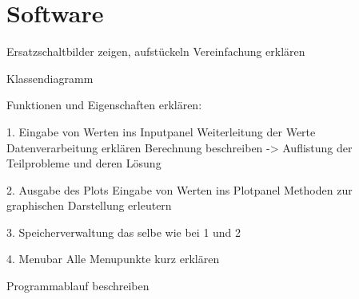 \section{Software} \label{sec:software}


Ersatzschaltbilder zeigen, aufstückeln
Vereinfachung erklären

Klassendiagramm

Funktionen und Eigenschaften erklären:

1. Eingabe von Werten ins Inputpanel
	Weiterleitung der Werte
	Datenverarbeitung erklären
	Berechnung beschreiben -> Auflistung der Teilprobleme und deren Lösung
	
2. Ausgabe des Plots
	Eingabe von Werten ins Plotpanel
	Methoden zur graphischen Darstellung erleutern
	
	
3. Speicherverwaltung
	das selbe wie bei 1 und 2


4. Menubar
	Alle Menupunkte kurz erklären


Programmablauf beschreiben



